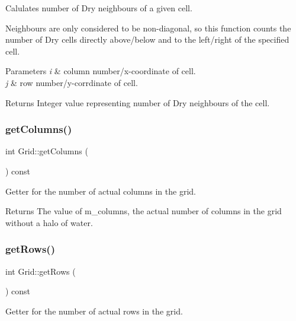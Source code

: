 Calulates number of Dry neighbours of a given cell. 

Neighbours are only considered to be non-\/diagonal, so this function counts the number of Dry cells directly above/below and to the left/right of the specified cell.


\begin{DoxyParams}{Parameters}
{\em i} & column number/x-\/coordinate of cell. \\
\hline
{\em j} & row number/y-\/corrdinate of cell.\\
\hline
\end{DoxyParams}
\begin{DoxyReturn}{Returns}
Integer value representing number of Dry neighbours of the cell. 
\end{DoxyReturn}
\mbox{\label{class_grid_aee0114021b6858483965cc1bffd7b88b}} 
\subsubsection{\texorpdfstring{get\+Columns()}{getColumns()}}
{\footnotesize\ttfamily int Grid\+::get\+Columns (\begin{DoxyParamCaption}{ }\end{DoxyParamCaption}) const}



Getter for the number of actual columns in the grid. 

\begin{DoxyReturn}{Returns}
The value of m\+\_\+columns, the actual number of columns in the grid without a halo of water. 
\end{DoxyReturn}
\mbox{\label{class_grid_aa9397afb775457f87b9096acf6082383}} 
\subsubsection{\texorpdfstring{get\+Rows()}{getRows()}}
{\footnotesize\ttfamily int Grid\+::get\+Rows (\begin{DoxyParamCaption}{ }\end{DoxyParamCaption}) const}



Getter for the number of actual rows in the grid. 

